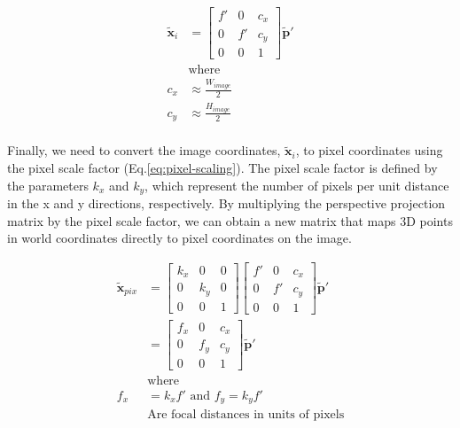 \begin{equation}
    \begin{aligned}
        \tilde{\mathbf{x}}_{i} &= \begin{bmatrix}
            f' & 0 & c_x \\ 0 & f' & c_y \\ 0 & 0 & 1 
        \end{bmatrix} \tilde{\mathbf{p}}' \\
        &\text{where} \\
        c_x &\approx \frac{W_{image}}{2} \\
        c_y &\approx \frac{H_{image}}{2} \\
    \end{aligned}
    \label{eq:principal-point}
\end{equation}

Finally, we need to convert the image coordinates, $\tilde{\mathbf{x}}_i$, to pixel coordinates using the pixel scale factor (Eq.\ref{eq:pixel-scaling}).
The pixel scale factor is defined by the parameters $k_x$ and $k_y$, which represent the number of pixels per unit distance in the x and y directions, respectively.
By multiplying the perspective projection matrix by the pixel scale factor, we can obtain a new matrix that maps 3D points in world coordinates directly to pixel coordinates on the image.

\begin{equation}
    \begin{aligned}
        \tilde{\mathbf{x}}_{pix} &= \begin{bmatrix}
            k_x & 0& 0 \\ 0 & k_y & 0 \\ 0 & 0 & 1
        \end{bmatrix} \begin{bmatrix}
            f' & 0 & c_x \\ 0 & f' & c_y \\ 0 & 0 & 1 
        \end{bmatrix}\tilde{\mathbf{p}}' \\
        & = \begin{bmatrix}
            f_x & 0 & c_x \\ 0 & f_y & c_y \\ 0 & 0 & 1 
        \end{bmatrix}\tilde{\mathbf{p}}'\\
        &\text{where}\\
        f_x &= k_x f' \text{        and        } f_y = k_y f' \\
        &\text{Are focal distances in units of pixels} 
    \end{aligned}
    \label{eq:pixel-scaling}
\end{equation}

